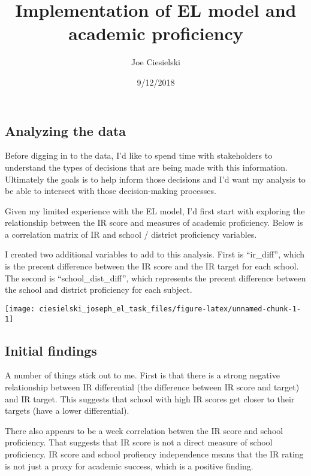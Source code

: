 \documentclass[]{article}
\title{Implementation of EL model and academic proficiency}
\author{Joe Ciesielski}
\date{9/12/2018}
\begin{document}
\maketitle

\hypertarget{analyzing-the-data}{%
\subsection{Analyzing the data}\label{analyzing-the-data}}

Before digging in to the data, I'd like to spend time with stakeholders
to understand the types of decisions that are being made with this
information. Ultimately the goals is to help inform those decisions and
I'd want my analysis to be able to intersect with those decision-making
processes.

Given my limited experience with the EL model, I'd first start with
exploring the relationship between the IR score and measures of academic
proficiency. Below is a correlation matrix of IR and school / district
proficiency variables.

I created two additional variables to add to this analysis. First is
``ir\_diff'', which is the precent difference between the IR score and
the IR target for each school. The second is ``school\_dist\_diff'',
which represents the precent difference between the school and district
proficiency for each subject.

\begin{center}\texttt{[image: ciesielski\_joseph\_el\_task\_files/figure-latex/unnamed-chunk-1-1]} \end{center}

\hypertarget{initial-findings}{%
\subsection{Initial findings}\label{initial-findings}}

A number of things stick out to me. First is that there is a strong
negative relationship between IR differential (the difference between IR
score and target) and IR target. This suggests that school with high IR
scores get closer to their targets (have a lower differential).

There also appears to be a week correlation betwen the IR score and
school proficiency. That suggests that IR score is not a direct measure
of school proficiency. IR score and school profiency independence means
that the IR rating is not just a proxy for academic success, which is a
positive finding.
\end{document}
